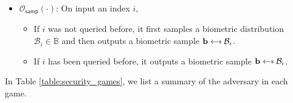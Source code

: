 \begin{itemize}
	\item $\mathcal{O}_\textsf{samp}(\cdot)$: On input an index $i$,
	\begin{itemize}
		\item If $i$ was not queried before, it first samples a biometric distribution $\mathcal{B}_i \in \mathbb{B}$ and then outputs a biometric sample $\mathbf{b} \getsdollar \mathcal{B}_i$.
		\item If $i$ has been queried before, it outputs a biometric sample $\mathbf{b} \getsdollar \mathcal{B}_i$.
	\end{itemize}
\end{itemize}

In Table \ref{table:security_games}, we list a summary of the adversary in each game.


